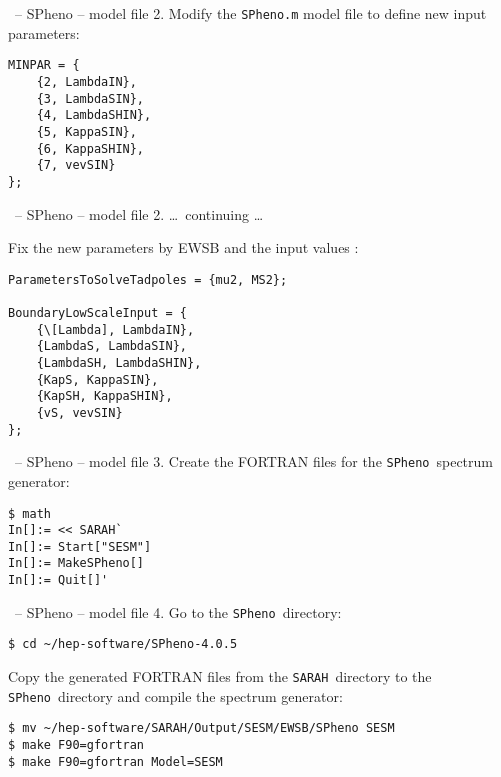 \documentclass[11pt]{beamer}
\newcommand{\SARAH}{\texttt{SARAH}}
\newcommand{\SPheno}{\texttt{SPheno}}
\begin{document}

\begin{frame}[fragile]{\insertsection\ -- SPheno -- model file}
  2. Modify the \texttt{SPheno.m} model file to define new input
  parameters:
  \begin{lstlisting}
MINPAR = {
    {2, LambdaIN},
    {3, LambdaSIN},
    {4, LambdaSHIN},
    {5, KappaSIN},
    {6, KappaSHIN},
    {7, vevSIN}
};\end{lstlisting}%
\end{frame}


\begin{frame}[fragile]{\insertsection\ -- SPheno -- model file}
  2. \ldots\ continuing \ldots

  \bigskip

  Fix the new parameters by EWSB and the input values :
  \begin{lstlisting}
ParametersToSolveTadpoles = {mu2, MS2};

BoundaryLowScaleInput = {
    {\[Lambda], LambdaIN},
    {LambdaS, LambdaSIN},
    {LambdaSH, LambdaSHIN},
    {KapS, KappaSIN},
    {KapSH, KappaSHIN},
    {vS, vevSIN}
};\end{lstlisting}%
\end{frame}


\begin{frame}[fragile]{\insertsection\ -- SPheno -- model file}
  3. Create the FORTRAN files for the \SPheno\ spectrum generator:
  \begin{lstlisting}
$ math
In[]:= << SARAH`
In[]:= Start["SESM"]
In[]:= MakeSPheno[]
In[]:= Quit[]'\end{lstlisting}%
\end{frame}


\begin{frame}[fragile]{\insertsection\ -- SPheno -- model file}
  4. Go to the \SPheno\ directory:
  \begin{lstlisting}
$ cd ~/hep-software/SPheno-4.0.5\end{lstlisting}%
  Copy the generated FORTRAN files from the \SARAH\ directory to the
  \SPheno\ directory and compile the spectrum generator:
  \begin{lstlisting}
$ mv ~/hep-software/SARAH/Output/SESM/EWSB/SPheno SESM
$ make F90=gfortran
$ make F90=gfortran Model=SESM\end{lstlisting}%
\end{frame}
\end{document}
